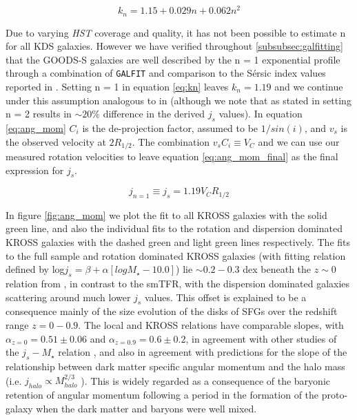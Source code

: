 \documentclass[fleqn,usenatbib]{mn2e}
\newcommand{\Sers}{S\'{e}rsic }
\begin{document}
\begin{equation}\label{eq:kn}
   k_{n} = 1.15 + 0.029n + 0.062n^{2}
\end{equation}

Due to varying {\em HST} coverage and quality, it has not been possible to estimate n for all KDS galaxies.
However we have verified throughout \cref{subsubsec:galfitting} that the GOODS-S galaxies are well described by the n = 1 exponential profile through a combination of {\tt GALFIT} and comparison to the \Sers index values reported in \cite{VanderWel2012}.
Setting n = 1 in equation \ref{eq:kn} leaves $k_{n} = 1.19$ and we continue under this assumption analogous to in \cite{Harrison2017} (although we note that as stated in \cite{Harrison2017} setting n = 2 results in $\sim20\%$ difference in the derived $j_{s}$ values).
In equation \ref{eq:ang_mom} $C_{i}$ is the de-projection factor, assumed to be $1/sin(i)$, and $v_{s}$ is the observed velocity at $2R_{1/2}$.
The combination $v_{s}C_{i} \equiv V_{C}$ and we can use our measured rotation velocities to leave equation \ref{eq:ang_mom_final} as the final expression for $j_{s}$. 

\begin{equation}\label{eq:ang_mom_final}
   j_{n=1} \equiv j_{s} = 1.19V_{C}R_{1/2}
\end{equation}

In figure \ref{fig:ang_mom} we plot the fit to all KROSS galaxies with the solid green line, and also the individual fits to the rotation and dispersion dominated KROSS galaxies with the dashed green and light green lines respectively.
The fits to the full sample and rotation dominated KROSS galaxies (with fitting relation defined by log$j_{s} =  \beta + \alpha[logM_{\star} - 10.0]$) lie $\sim0.2-0.3$ dex beneath the $z\sim0$ relation from \cite{Romanowsky2012}, in contrast to the smTFR, with the dispersion dominated galaxies scattering around much lower $j_{s}$ values.
This offset is explained to be a consequence mainly of the size evolution of the disks of SFGs over the redshift range $z=0-0.9$.
The local and KROSS relations have comparable slopes, with $\alpha_{z=0}=0.51\pm0.06$ and $\alpha_{z=0.9}=0.6\pm0.2$, in agreement with other studies of the $j_{s}-M_{\star}$ relation \citep{Cortese2016,Contini2015a,Burkert2016a,Swinbank2017}, and also in agreement with predictions for the slope of the relationship between dark matter specific angular momentum and the halo mass (i.e. $j_{halo} \propto M_{halo}^{2/3}$ \citep[e.g.][]{Barnes1987}).
This is widely regarded as a consequence of the baryonic retention of angular momentum following a period in the formation of the proto-galaxy when the dark matter and baryons were well mixed. \\
\end{document}
